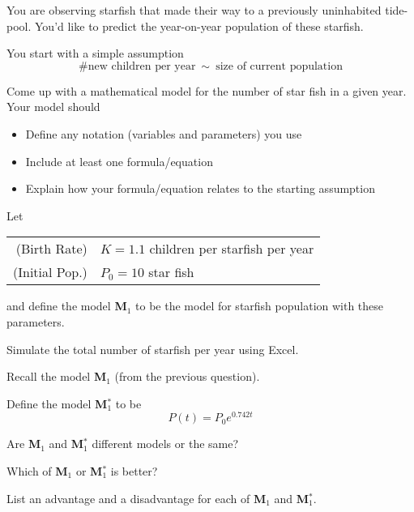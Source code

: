 \documentclass{workbook}
\begin{document}
\begin{slide}

	\question
	You are observing starfish that made their way to a previously uninhabited tide-pool.
	You'd like to predict the year-on-year population of these starfish.

	You start with a simple assumption
	\[
		\# \text{new children per year}\ \sim\ \text{size of current population}
	\]
	\begin{parts}
		\item Come up with a mathematical model for the number of star fish in a given year.
		Your model should
		\begin{itemize}
			\item Define any notation (variables and parameters) you use
			\item Include at least one formula/equation
			\item Explain how your formula/equation relates to the starting assumption
		\end{itemize}
	\end{parts}
\end{slide}

\begin{slide}
	\question
		Let

		\begin{tabular}{rl}
			(Birth Rate) & $K=1.1$ children per starfish per year \\
			(Initial Pop.) & $P_0=10$ star fish
		\end{tabular}

		and define the model \textbf{M$_1$} to be the model for starfish population with
		these parameters.
	\begin{parts}
		\item Simulate the total number of starfish per year using Excel.
	\end{parts}
\end{slide}

\begin{slide}
	\question
	Recall the model \textbf{M$_1$} (from the previous question). 

	Define the model \textbf{M$_1^*$} to be
	\[
		P(t) = P_0 e^{0.742 t}
	\]
	\begin{parts}
		\item Are \textbf{M$_1$} and \textbf{M$_1^*$} different models or the same?
		\item Which of \textbf{M$_1$} or \textbf{M$_1^*$} is better?
		\item List an advantage and a disadvantage for each of \textbf{M$_1$} and \textbf{M$_1^*$}.
	\end{parts}
\end{slide}
\end{document}

